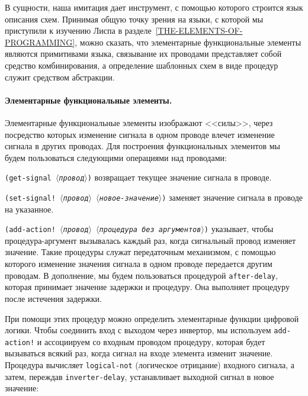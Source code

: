В сущности, наша имитация дает инструмент, с помощью которого
строится язык описания схем.  Принимая общую точку зрения на
языки, с которой мы приступили к изучению Лиспа в
разделе~\ref{THE-ELEMENTS-OF-PROGRAMMING}, можно сказать, что
элементарные функциональные элементы являются примитивами языка,
связывание их проводами представляет собой средство комбинирования, а
определение шаблонных схем в виде процедур служит средством
абстракции.

\paragraph{Элементарные функциональные элементы.}


Элементарные функциональные элементы изображают <<силы>>,
через посредство которых изменение сигнала в одном проводе влечет
изменение сигнала в других проводах.  Для построения функциональных
элементов мы будем пользоваться следующими операциями над проводами:

\begin{plainlist}
\item
{\tt (get-signal \textit{$\langle$провод$\rangle$})}%
 возвращает текущее значение сигнала в проводе.

\item
{\tt (set-signal! \textit{$\langle$провод$\rangle$} \textit{$\langle$новое-значение$\rangle$})}%
 заменяет значение сигнала в проводе на указанное.

\item
{\tt (add-action! \textit{$\langle$провод$\rangle$} \textit{$\langle$процедура без аргументов$\rangle$})}%
 указывает, чтобы процедура-аргумент вызывалась каждый раз, когда
сигнальный провод изменяет значение. Такие процедуры служат
передаточным механизмом, с помощью которого изменение значения сигнала
в одном проводе передается другим проводам.  В дополнение, мы будем
пользоваться процедурой {\tt after-delay}, которая принимает
значение задержки и процедуру.  Она выполняет процедуру после
истечения задержки.
\end{plainlist}

При помощи этих процедур можно определить
элементарные функции цифровой логики.  Чтобы соединить вход с выходом
через инвертор, мы используем {\tt add-action!} и
ассоциируем со входным проводом процедуру, которая будет вызываться
всякий раз, когда сигнал на входе элемента изменит значение.
Процедура вычисляет {\tt logical-not} (логическое отрицание)
входного сигнала, а затем, переждав {\tt inverter-delay},
устанавливает выходной сигнал в новое значение:

